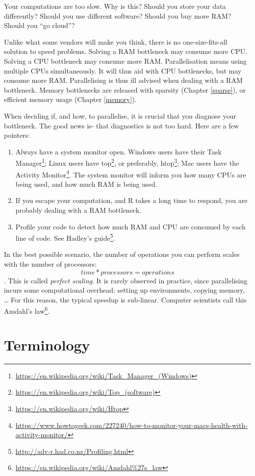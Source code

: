\documentclass[]{book}
\renewcommand{\href}[2]{#2\footnote{\url{#1}}}
\theoremstyle{definition}
\theoremstyle{definition}
\theoremstyle{definition}
\theoremstyle{remark}
\begin{document}
Your computations are too slow.
Why is this?
Should you store your data differently?
Should you use different software?
Should you buy more RAM?
Should you ``go cloud''?

Unlike what some vendors will make you think, there is no one-size-fits-all solution to speed problems.
Solving a RAM bottleneck may consume more CPU.
Solving a CPU bottleneck may consume more RAM.
Parallelisation means using multiple CPUs simultaneously.
It will thus aid with CPU bottlenecks, but may consume more RAM.
Parallelising is thus ill advised when dealing with a RAM bottleneck.
Memory bottlenecks are released with sparsity (Chapter \ref{sparse}), or efficient memory usage (Chapter \ref{memory}).

When deciding if, and how, to parallelise, it is crucial that you diagnose your bottleneck.
The good news is- that diagnostics is not too hard.
Here are a few pointers:

\begin{enumerate}
\def\labelenumi{\arabic{enumi}.}
\item
  Always have a system monitor open. Windows users have their \href{https://en.wikipedia.org/wiki/Task_Manager_(Windows)}{Task Manager}; Linux users have \href{https://en.wikipedia.org/wiki/Top_(software)}{top}, or preferably, \href{https://en.wikipedia.org/wiki/Htop}{htop}; Mac users have the \href{https://www.howtogeek.com/227240/how-to-monitor-your-macs-health-with-activity-monitor/}{Activity Monitor}. The system monitor will inform you how many CPUs are being used, and how much RAM is being used.
\item
  If you escape your computation, and R takes a long time to respond, you are probably dealing with a RAM bottleneck.
\item
  Profile your code to detect how much RAM and CPU are consumed by each line of code. See Hadley's \href{http://adv-r.had.co.nz/Profiling.html}{guide}.
\end{enumerate}

In the best possible scenario, the number of operations you can perform scales with the number of processors: \[time * processors = operations\].
This is called \emph{perfect scaling}.
It is rarely observed in practice, since parallelising incurs some computational overhead: setting up environments, copying memory, \ldots{}
For this reason, the typical speedup is sub-linear.
Computer scientists call this \href{https://en.wikipedia.org/wiki/Amdahl\%27s_law}{Amdahl's law}.

\hypertarget{terminology}{%
\section{Terminology}\label{terminology}}
\end{document}
